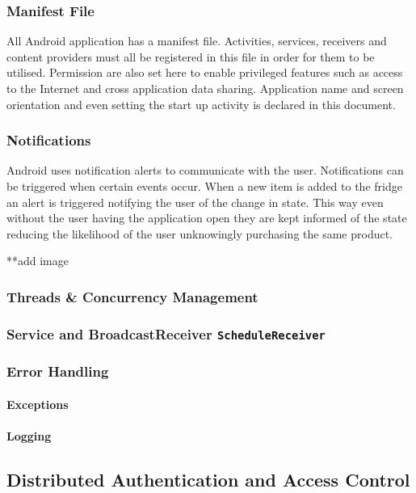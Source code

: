 \documentclass[a4paper, 11pt]{article}
\begin{document}
\subsubsection{Manifest File}
All Android application has a manifest file. Activities, services, receivers and content providers must all be registered in this file in order for them to be utilised. Permission are also set here to enable privileged features such as access to the Internet and cross application data sharing. Application name and screen orientation and even setting the start up activity is declared in this document.

\subsubsection{Notifications}
Android uses notification alerts to communicate with the user. Notifications can be triggered when certain events occur. When a new item is added to the fridge an alert is triggered notifying the user of the change in state. This way even without the user having the application open they are kept informed of the state reducing the likelihood of the user unknowingly purchasing the same product.

**add image
\subsubsection{Threads \& Concurrency Management}
\subsubsection{Service and BroadcastReceiver 
\texttt{ScheduleReceiver}
}


\subsubsection{Error Handling}
\paragraph{Exceptions}
\paragraph{Logging}


\subsection{Distributed Authentication and Access Control}
\end{document}
